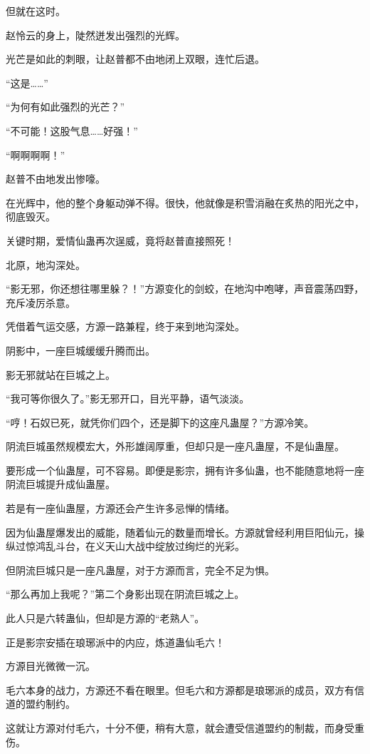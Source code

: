 \begin{this_body}
但就在这时。

赵怜云的身上，陡然迸发出强烈的光辉。

光芒是如此的刺眼，让赵普都不由地闭上双眼，连忙后退。

“这是……”

“为何有如此强烈的光芒？”

“不可能！这股气息……好强！”

“啊啊啊啊！”

赵普不由地发出惨嚎。

在光辉中，他的整个身躯动弹不得。很快，他就像是积雪消融在炙热的阳光之中，彻底毁灭。

关键时期，爱情仙蛊再次逞威，竟将赵普直接照死！

北原，地沟深处。

“影无邪，你还想往哪里躲？！”方源变化的剑蛟，在地沟中咆哮，声音震荡四野，充斥凌厉杀意。

凭借着气运交感，方源一路兼程，终于来到地沟深处。

阴影中，一座巨城缓缓升腾而出。

影无邪就站在巨城之上。

“我可等你很久了。”影无邪开口，目光平静，语气淡淡。

“哼！石奴已死，就凭你们四个，还是脚下的这座凡蛊屋？”方源冷笑。

阴流巨城虽然规模宏大，外形雄阔厚重，但却只是一座凡蛊屋，不是仙蛊屋。

要形成一个仙蛊屋，可不容易。即便是影宗，拥有许多仙蛊，也不能随意地将一座阴流巨城提升成仙蛊屋。

若是有一座仙蛊屋，方源还会产生许多忌惮的情绪。

因为仙蛊屋爆发出的威能，随着仙元的数量而增长。方源就曾经利用巨阳仙元，操纵过惊鸿乱斗台，在义天山大战中绽放过绚烂的光彩。

但阴流巨城只是一座凡蛊屋，对于方源而言，完全不足为惧。

“那么再加上我呢？”第二个身影出现在阴流巨城之上。

此人只是六转蛊仙，但却是方源的“老熟人”。

正是影宗安插在琅琊派中的内应，炼道蛊仙毛六！

方源目光微微一沉。

毛六本身的战力，方源还不看在眼里。但毛六和方源都是琅琊派的成员，双方有信道的盟约制约。

这就让方源对付毛六，十分不便，稍有大意，就会遭受信道盟约的制裁，而身受重伤。


\end{this_body}
